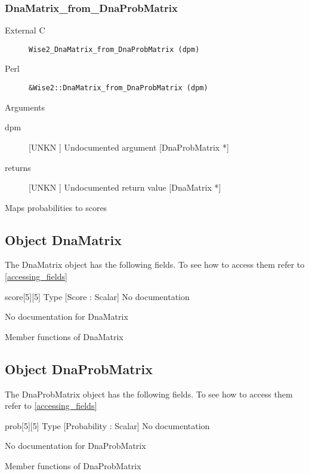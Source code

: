 \subsubsection{DnaMatrix_from_DnaProbMatrix}
\begin{description}
\item[External C] {\tt Wise2_DnaMatrix_from_DnaProbMatrix (dpm)}
\item[Perl] {\tt &Wise2::DnaMatrix_from_DnaProbMatrix (dpm)}

\end{description}
Arguments
\begin{description}
\item[dpm] [UNKN ] Undocumented argument [DnaProbMatrix *]
\item[returns] [UNKN ] Undocumented return value [DnaMatrix *]
\end{description}
Maps probabilities to scores




\subsection{Object DnaMatrix}

\label{object_DnaMatrix}

The DnaMatrix object has the following fields. To see how to access them refer to \ref{accessing_fields}
\begin{description}
\item{score[5][5]} Type [Score : Scalar] No documentation

\end{description}
No documentation for DnaMatrix

Member functions of DnaMatrix

\subsection{Object DnaProbMatrix}

\label{object_DnaProbMatrix}

The DnaProbMatrix object has the following fields. To see how to access them refer to \ref{accessing_fields}
\begin{description}
\item{prob[5][5]} Type [Probability : Scalar] No documentation

\end{description}
No documentation for DnaProbMatrix

Member functions of DnaProbMatrix

